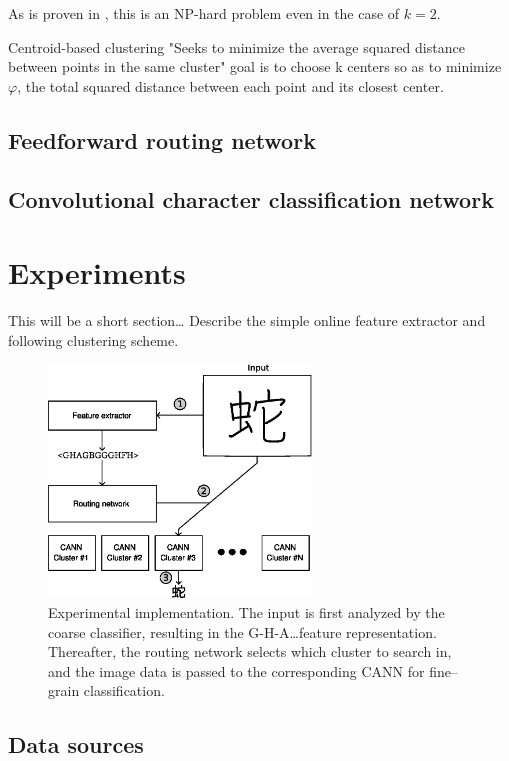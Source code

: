 \documentclass[10pt,conference,a4paper]{IEEEtran}
\begin{document}
	As is proven in \cite{drineas2004clustering}, this is an NP-hard problem even in the case of $k = 2$. 

	Centroid-based clustering
	"Seeks to minimize the average squared distance between points in the same cluster"
	goal is to choose k centers so as to minimize $\varphi$, the total squared distance between each point and its closest center.

	\subsection{Feedforward routing network}


	\subsection{Convolutional character classification network}


	\section{Experiments}
	\label{sec:experiments}

	This will be a short section\ldots
	Describe the simple online feature extractor and following clustering scheme.

	\begin{figure}
		\centering
		\includegraphics[width=2.75in]{./fig/experimental-implementation.eps}
		\caption{Experimental implementation. The input is first analyzed by the coarse classifier, resulting in the G-H-A\ldots feature representation.
		Thereafter, the routing network selects which cluster to search in, and the image data is passed to the corresponding CANN for fine--grain classification.}
		\label{fig_experimental_implementation}
	\end{figure}



	\subsection{Data sources}
\end{document}
